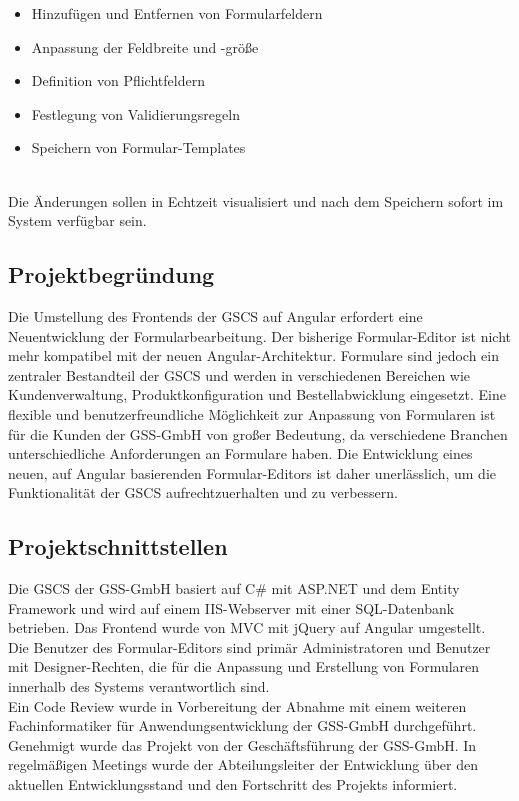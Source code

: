 \documentclass[a4paper,11pt]{article}
\begin{document}
\begin{itemize}
\item Hinzufügen und Entfernen von Formularfeldern
\item Anpassung der Feldbreite und -größe
\item Definition von Pflichtfeldern
\item Festlegung von Validierungsregeln
\item Speichern von Formular-Templates
\end{itemize}\\
Die Änderungen sollen in Echtzeit visualisiert und nach dem Speichern sofort im System verfügbar sein.

\subsection{Projektbegründung}

Die Umstellung des Frontends der GSCS auf Angular erfordert eine Neuentwicklung der Formularbearbeitung. Der bisherige Formular-Editor ist nicht mehr kompatibel mit der neuen Angular-Architektur. Formulare sind jedoch ein zentraler Bestandteil der GSCS und werden in verschiedenen Bereichen wie Kundenverwaltung, Produktkonfiguration und Bestellabwicklung eingesetzt.
Eine flexible und benutzerfreundliche Möglichkeit zur Anpassung von Formularen ist für die Kunden der GSS-GmbH von großer Bedeutung, da verschiedene Branchen unterschiedliche Anforderungen an Formulare haben. Die Entwicklung eines neuen, auf Angular basierenden Formular-Editors ist daher unerlässlich, um die Funktionalität der GSCS aufrechtzuerhalten und zu verbessern.

\subsection{Projektschnittstellen}

Die GSCS der GSS-GmbH basiert auf C\# mit ASP.NET und dem Entity Framework und wird auf einem IIS-Webserver mit einer SQL-Datenbank betrieben. Das Frontend wurde von MVC mit jQuery auf Angular umgestellt.\\
Die Benutzer des Formular-Editors sind primär Administratoren und Benutzer mit Designer-Rechten, die für die Anpassung und Erstellung von Formularen innerhalb des Systems verantwortlich sind.\\
Ein Code Review wurde in Vorbereitung der Abnahme mit einem weiteren Fachinformatiker für Anwendungsentwicklung der GSS-GmbH durchgeführt.\\
Genehmigt wurde das Projekt von der Geschäftsführung der GSS-GmbH. In regelmäßigen Meetings wurde der Abteilungsleiter der Entwicklung über den aktuellen Entwicklungsstand und den Fortschritt des Projekts informiert.
\end{document}

